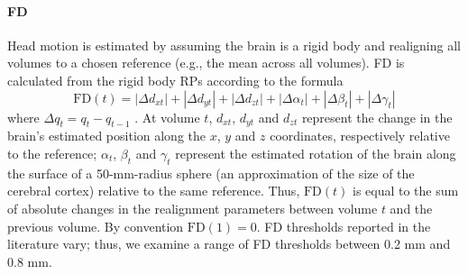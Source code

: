 \documentclass{article}
\begin{document}
\paragraph{FD} Head motion is estimated by assuming the brain is a rigid body and realigning all volumes to a chosen reference (e.g., the mean across all volumes). FD is calculated from the rigid body RPs according to the formula 
$$
\text{FD}(t) = |\Delta d_{xt}| + |\Delta d_{yt}| + |\Delta d_{zt}| + |\Delta \alpha_{t}| + |\Delta \beta_{t}| + |\Delta \gamma_{t}|
$$ 
where $\Delta q_t = q_t - q_{t-1}$ \citep{powerSpuriousSystematicCorrelations2012}. At volume $t$, $d_{xt}$, $d_{yt}$ and $d_{zt}$ represent the change in the brain's estimated position along the $x$, $y$ and $z$ coordinates, respectively relative to the reference; $\alpha_{t}$, $\beta_{t}$ and $\gamma_{t}$ represent the estimated rotation of the brain along the surface of a 50-mm-radius sphere (an approximation of the size of the cerebral cortex) relative to the same reference. Thus, $\text{FD}(t)$ is equal to the sum of absolute changes in the realignment parameters between volume $t$ and the previous volume. By convention $\text{FD}(1)=0$. FD thresholds reported in the literature vary; thus, we examine a range of FD thresholds between 0.2 mm and 0.8 mm. 
\end{document}
